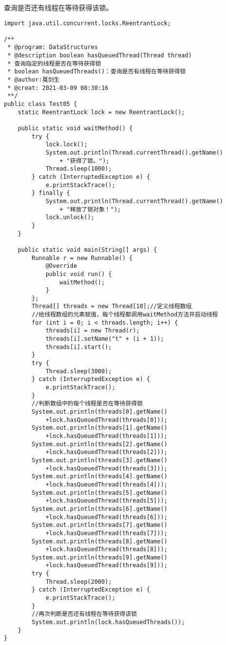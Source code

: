 \documentclass[a4paper]{report}
\begin{document}
\subsubsection{}
查询是否还有线程在等待获得该锁。

\begin{Verbatim}[frame=single,numbersep=5pt,xleftmargin=1.5em,xrightmargin=1.5em]
import java.util.concurrent.locks.ReentrantLock;

/**
 * @program: DataStructures
 * @description boolean hasQueuedThread(Thread thread)
 * 查询指定的线程是否在等待获得锁
 * boolean hasQueuedThreads()：查询是否有线程在等待获得锁
 * @author:戛剑生
 * @creat: 2021-03-09 08:30:16
 **/
public class Test05 {
    static ReentrantLock lock = new ReentrantLock();

    public static void waitMethod() {
        try {
            lock.lock();
            System.out.println(Thread.currentThread().getName()
                + "获得了锁。");
            Thread.sleep(1000);
        } catch (InterruptedException e) {
            e.printStackTrace();
        } finally {
            System.out.println(Thread.currentThread().getName()
                + "释放了锁对象！");
            lock.unlock();
        }
    }

    public static void main(String[] args) {
        Runnable r = new Runnable() {
            @Override
            public void run() {
                waitMethod();
            }
        };
        Thread[] threads = new Thread[10];//定义线程数组
        //给线程数组的元素赋值，每个线程都调用waitMethod方法并启动线程
        for (int i = 0; i < threads.length; i++) {
            threads[i] = new Thread(r);
            threads[i].setName("t" + (i + 1));
            threads[i].start();
        }
        try {
            Thread.sleep(3000);
        } catch (InterruptedException e) {
            e.printStackTrace();
        }
        //判断数组中的每个线程是否在等待获得锁
        System.out.println(threads[0].getName()
            +lock.hasQueuedThread(threads[0]));
        System.out.println(threads[1].getName()
            +lock.hasQueuedThread(threads[1]));
        System.out.println(threads[2].getName()
            +lock.hasQueuedThread(threads[2]));
        System.out.println(threads[3].getName()
            +lock.hasQueuedThread(threads[3]));
        System.out.println(threads[4].getName()
            +lock.hasQueuedThread(threads[4]));
        System.out.println(threads[5].getName()
            +lock.hasQueuedThread(threads[5]));
        System.out.println(threads[6].getName()
            +lock.hasQueuedThread(threads[6]));
        System.out.println(threads[7].getName()
            +lock.hasQueuedThread(threads[7]));
        System.out.println(threads[8].getName()
            +lock.hasQueuedThread(threads[8]));
        System.out.println(threads[9].getName()
            +lock.hasQueuedThread(threads[9]));
        try {
            Thread.sleep(2000);
        } catch (InterruptedException e) {
            e.printStackTrace();
        }
        //再次判断是否还有线程在等待获得该锁
        System.out.println(lock.hasQueuedThreads());
    }
}
\end{Verbatim}
\end{document}
